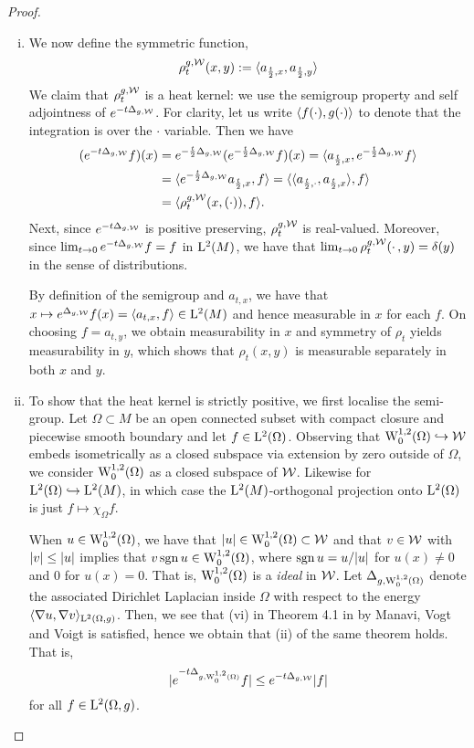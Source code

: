 \documentclass[a4paper, 12pt]{amsart}
\begin{document}
\begin{proof}
\begin{enumerate}[(i)]
\item We now define the symmetric function,
  $$\hk^{g,\cW}_t(x,y) := \inprod{a_{\frac{t}{2}, x}, a_{\frac{t}{2}, y}}$$
        We claim that \(\hk_t^{g,\cW}\) is a heat kernel: we use the semigroup property and self adjointness of \(e^{-t\Delta_{g,\cW}}\). For clarity, let us write \(\inprod{f(\cdot), g(\cdot)}\) to denote that the integration is over the \(\cdot\) variable. Then we have
	\[
        \begin{split}
        (e^{-t \Delta_{g,\cW}}f) (x) &= e^{-\frac{t}{2} \Delta_{g,\cW}} (e^{-\frac{t}{2} \Delta_{g,\cW}} f) (x) = \inprod{a_{\frac{t}{2},x}, e^{-\frac{t}{2} \Delta_{g,\cW}} f} \\
        &= \inprod{e^{-\frac{t}{2} \Delta_{g,\cW}} a_{\frac{t}{2},x}, f} = \inprod{\inprod{a_{\frac{t}{2},\cdot}, a_{\frac{t}{2},x}}, f} \\
        &= \inprod{\hk^{g,\cW}_t(x,(\cdot)), f}.
        \end{split}
        \]
        Next, since $e^{-t \Delta_{g,\cW}}$	is positive preserving, $\hk_t^{g,\cW}$ is real-valued. Moreover, since $\lim_{t\to 0} e^{-t\Delta_{g,\cW}}f = f$ in $\Lp{2}(M)$, we have that $\lim_{t \to 0} \hk^{g,\cW}_t(\mdot,y) = \delta(y)$ in the sense of distributions.

        By definition of the semigroup and $a_{t,x}$, we have that $x\mapsto e^{\Delta_{g,\cW}}f(x) = \inprod{a_{t,x},f} \in \Lp{2}(M)$
	and hence measurable in $x$ for each $f$. 
	On choosing \(f = a_{t,y}\), we obtain 
	measurability in \(x\) and symmetry of \(\rho_t\) yields measurability in \(y\),
	which shows that \(\rho_t(x, y)\) is measurable separately in both \(x\) and \(y\). 

\item To show that the heat kernel is strictly positive, we first localise the semi-group.
	Let $\Omega \subset M$ be an open connected subset with compact closure and piecewise smooth boundary  and let $f \in \Lp{2}(\Omega)$.
	Observing that $\SobH[0]{1}(\Omega) \embed \cW$ embeds isometrically as a closed subspace via extension by zero outside of $\Omega$, we consider \(\SobH[0]{1}(\Omega)\) as a closed subspace of $\cW$. Likewise for $\Lp{2}(\Omega) \embed \Lp{2}(M)$, in which case the $\Lp{2}(M)$-orthogonal projection onto $\Lp{2}(\Omega)$ is just $f \mapsto \chi_{\Omega} f$.

        When $u \in \SobH[0]{1}(\Omega)$, we have that $\modulus{u} \in \SobH[0]{1}(\Omega) \subset \cW$ and that $v \in \cW$ with $\modulus{v} \leq \modulus{u}$ implies that $v \sgn u \in \SobH[0]{1}(\Omega)$,
	where $\sgn u = u/\modulus{u}$ for $u(x) \neq 0$ and $0$ for $u(x) = 0$. That is, $\SobH[0]{1}(\Omega)$ is a \emph{ideal} in $\cW$. Let $\Delta_{g,\SobH[0]{1}(\Omega)}$ denote the associated Dirichlet Laplacian inside $\Omega$ with respect to the energy $\inprod{\nabla u, \nabla v}_{\Lp{2}(\Omega, g)}$. Then, we see that (vi) in Theorem 4.1 in \cite{MVV} by Manavi, Vogt and Voigt is satisfied, hence we obtain that (ii) of the same theorem holds. That is,
 	$$ \modulus{e^{-t\Delta_{g, \SobH[0]{1}(\Omega)}} f} \leq e^{-t \Delta_{g, \cW}} \modulus{f}$$
	for all $f \in \Lp{2}(\Omega,g)$.


\end{enumerate}
\end{proof}
\end{document}
